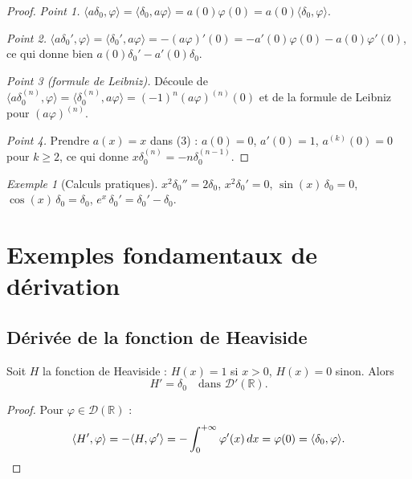 \documentclass[12pt,a4paper,openany]{book}
\theoremstyle{definition}
\theoremstyle{plain}
\theoremstyle{remark}
\newtheorem*{example}{Exemple}
\newenvironment{exemple}{\begin{example}}{\end{example}}
\begin{document}
	\begin{proof}
		\emph{Point 1.} $\langle a\delta_0, \varphi\rangle = \langle \delta_0, a\varphi\rangle = a(0)\varphi(0) = a(0)\langle\delta_0,\varphi\rangle$.
		
		\emph{Point 2.} $\langle a\delta_0', \varphi\rangle = \langle \delta_0', a\varphi\rangle = -(a\varphi)'(0) = -a'(0)\varphi(0) - a(0)\varphi'(0)$, ce qui donne bien $a(0)\delta_0' - a'(0)\delta_0$.
		
		\emph{Point 3 (formule de Leibniz).} Découle de $\langle a\delta_0^{(n)}, \varphi\rangle = \langle\delta_0^{(n)}, a\varphi\rangle = (-1)^n(a\varphi)^{(n)}(0)$ et de la formule de Leibniz pour $(a\varphi)^{(n)}$.
		
		\emph{Point 4.} Prendre $a(x) = x$ dans (3) : $a(0) = 0$, $a'(0) = 1$, $a^{(k)}(0) = 0$ pour $k \geq 2$, ce qui donne $x\delta_0^{(n)} = -n\delta_0^{(n-1)}$.
	\end{proof}
	
	\begin{exemple}[Calculs pratiques]
		$x^2\delta_0'' = 2\delta_0$, \quad $x^2\delta_0' = 0$, \quad $\sin(x)\,\delta_0 = 0$, \quad $\cos(x)\,\delta_0 = \delta_0$, \quad $e^x\,\delta_0' = \delta_0' - \delta_0$.
	\end{exemple}
	
	\section{Exemples fondamentaux de dérivation}
	
	\subsection{Dérivée de la fonction de Heaviside}
	
	\begin{proposition}
		Soit $H$ la fonction de Heaviside : $H(x) = 1$ si $x > 0$, $H(x) = 0$ sinon. Alors
		\[
		H' = \delta_0 \quad \text{dans } \mathcal{D}'(\mathbb{R}).
		\]
	\end{proposition}
	
	\begin{proof}
		Pour $\varphi \in \mathcal{D}(\mathbb{R})$ :
		\[
		\langle H', \varphi \rangle = -\langle H, \varphi'\rangle = -\int_0^{+\infty}\varphi'(x)\,dx = \varphi(0) = \langle\delta_0,\varphi\rangle. \qedhere
		\]
	\end{proof}
	
\end{document}
